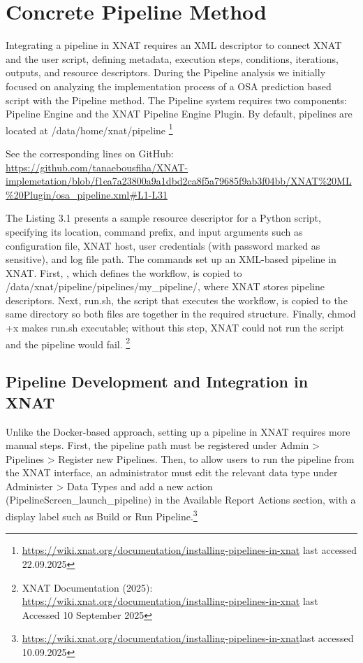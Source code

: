 
\section{Concrete Pipeline Method}

Integrating a pipeline in XNAT requires an \ac{XML} descriptor to connect XNAT and the user script, defining metadata, execution steps, conditions, iterations, outputs, and resource descriptors.
During the Pipeline analysis we initially focused on analyzing the implementation process of a OSA prediction based script with the Pipeline method. The Pipeline system requires two components: Pipeline Engine and the XNAT Pipeline Engine Plugin. By default, pipelines are located at /data/home/xnat/pipeline \footnote{\url{https://wiki.xnat.org/documentation/installing-pipelines-in-xnat} last accessed 22.09.2025}





\noindent\footnotesize See the corresponding lines on GitHub:\url{ https://github.com/tanaebousfiha/XNAT-implemetation/blob/f1ea7a23800a9a1dbd2ca8f5a79685f9ab3f04bb/XNAT%20ML%20Plugin/osa_pipeline.xml#L1-L31}


The  Listing 3.1 presents a sample resource descriptor for a Python script, specifying its location, command prefix, and input arguments such as configuration file, XNAT host, user credentials (with password marked as sensitive), and log file path. 
The commands set up an XML-based pipeline in XNAT. First, , which defines the workflow, is copied to /data/xnat/pipeline/pipelines/my\_pipeline/, where XNAT stores pipeline descriptors. Next, run.sh, the script that executes the workflow, is copied to the same directory so both files are together in the required structure. Finally, chmod +x makes run.sh executable; without this step, XNAT could not run the script and the pipeline would fail.
\footnote{XNAT Documentation (2025): \url{https://wiki.xnat.org/documentation/installing-pipelines-in-xnat} last Accessed 10 September 2025}

\subsection{Pipeline Development and Integration in XNAT}
Unlike the Docker-based approach, setting up a pipeline in XNAT requires more manual steps. First, the pipeline path must be registered under Admin > Pipelines > Register new Pipelines. Then, to allow users to run the pipeline from the XNAT interface, an administrator must edit the relevant data type under Administer > Data Types and add a new action (PipelineScreen\_launch\_pipeline) in the Available Report Actions section, with a display label such as Build or Run Pipeline.\footnote{\url{https://wiki.xnat.org/documentation/installing-pipelines-in-xnat}last accessed 10.09.2025}

